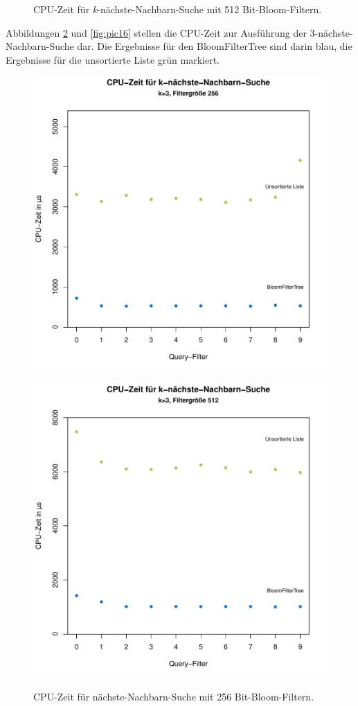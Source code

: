 \begin{figure}[hptb]
	\caption[CPU-Zeit für nächste-Nachbarn-Suche mit 512 Bit-Bloom-Filtern]{CPU-Zeit für \textit{k}-nächste-Nachbarn-Suche mit 512 Bit-Bloom-Filtern.}\label{fig:pic14}
\end{figure}

Abbildungen \ref{fig:pic15} und \ref{fig:pic16} stellen die CPU-Zeit zur Ausführung der 3-nächste-Nachbarn-Suche dar. Die Ergebnisse für den BloomFilterTree sind darin blau, die Ergebnisse für die unsortierte Liste grün markiert.  
\begin{figure}[hptb]
	\centering
	\includegraphics[scale=0.7]{pictures/cputime_nn3_256.pdf}\\
	\caption[CPU-Zeit für 3-nächste-Nachbarn-Suche mit 256 Bit-Bloom-Filtern]{CPU-Zeit für nächste-Nachbarn-Suche mit 256 Bit-Bloom-Filtern.}\label{fig:pic15}
	\includegraphics[scale=0.7]{pictures/cputime_nn3_512.pdf}\\

\end{figure}

